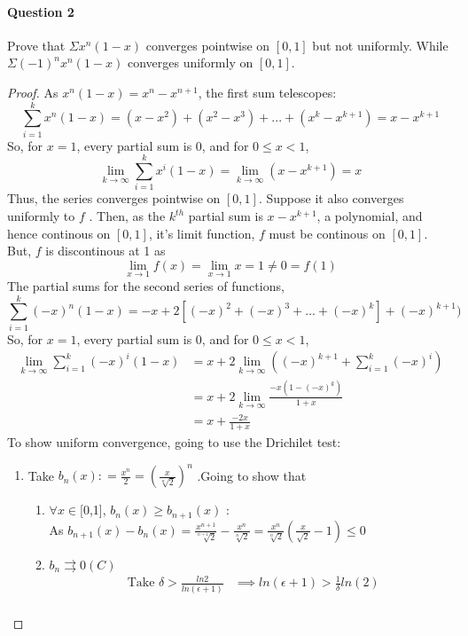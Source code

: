 \documentclass[20pt,a4paper]{extarticle} %
\begin{document}
\paragraph{Question 2}
Prove that $\Sigma x^n(1-x)$ converges pointwise on $[0,1]$ but not uniformly.
While $\Sigma (-1)^nx^n(1-x) $ converges uniformly on $[0,1]$.
\begin{proof}
	As $x^n(1-x) = x^n - x^{n+1}$, the first sum telescopes:
	\[\sum_{i=1}^k x^n(1-x) = (x - x^2) + (x^2 -x^3) +... + (x^k -x^{k+1}) = x- x^{k+1} \]
	So, for $x=1$, every partial sum is 0, and for $0\leq x <1$,
	\[ \lim_{k \to \infty } \sum_{i=1}^k x^i(1-x) = \lim_{k \to \infty }(x - x^{k+1})=x\]
	Thus, the series converges pointwise on $[0,1]$. Suppose it also converges uniformly to $f$ .
	Then, as the $k^{th}$ partial sum is $x-x^{k+1}$, a polynomial, and hence continous on $[0,1]$,
	it's limit function, $f$ must be continous on $[0,1]$. But, $f$ is discontinous at 1 as
	\[ \lim_{x \to 1} f(x) = \lim_{x \to 1} x = 1 \neq 0 = f(1) \]
	\pagebreak
	The partial sums for the second series of functions,
	\[\sum_{i=1}^k (-x)^n(1-x) = -x +2[(-x)^2 + (-x)^3 + ... + (-x)^k] + (-x)^{k+1})\]
	So, for $x=1$, every partial sum is 0, and for $0\leq x <1$,
	\begin{align*}
		\lim_{k \to \infty } \sum_{i=1}^k (-x)^i(1-x) &= x + 2\lim_{k \to \infty }((-x)^{k+1}+\sum_{i=1}^k (-x)^i ) \\
							      &=x + 2 \lim_{k \to \infty }\frac{-x(1-(-x)^k)}{1+x}\\
							      &=x+\frac{-2x}{1+x}
	\end{align*}
	To show uniform convergence, going to use the Drichilet test:
	\begin{enumerate}[label=\Roman*]
		\item Take $b_n(x): = \frac{x^n}{2} = (\frac{x}{\sqrt[n]{2}})^n$ .Going to show that
			\begin{enumerate}[label=(\roman*)]
				\item $\forall x \in$[0,1], $b_n(x) \geq b_{n+1}(x)$ : \\
					As $b_{n+1}(x) - b_{n}(x) = \frac{x^{n+1}}{\sqrt[n+1]{2}} -
					\frac{x^n}{\sqrt[n]{2}}= \frac{x^n}{\sqrt[n]{2}}(\frac{x}{\sqrt{2}}-1) \leq 0  $
				\item $b_n \rightrightarrows 0(C)$ \\
					\begin{align*}
						\text{ Take } \delta > \frac{ln2}{ln(\epsilon +1)} &\implies ln(\epsilon+1) >
					\frac{1}{\delta}ln(2) \\

\end{align*}
\end{enumerate}
\end{enumerate}
\end{proof}
\end{document}
